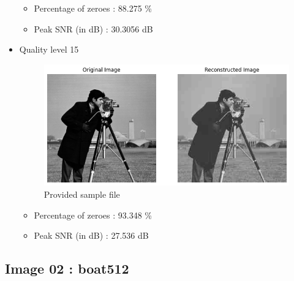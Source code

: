 \documentclass[11pt,a4paper]{article}
\begin{document}
\begin{itemize}
    \begin{itemize}
        \item Percentage of zeroes : 88.275 \%
        \item Peak SNR (in dB)     : 30.3056 dB
    \end{itemize}


    \newpage



    \item Quality level 15
    {\begin{figure}[h]
        \centering
        \includegraphics[width=1.0\linewidth]{images/im1q3.png}
        \caption{Provided sample file}
    \end{figure}}

    \begin{itemize}
        \item Percentage of zeroes : 93.348 \%
        \item Peak SNR (in dB)     : 27.536 dB
    \end{itemize}


\end{itemize}

\subsection{Image 02 : boat512} 
\end{document}
